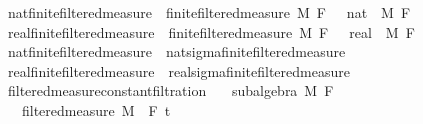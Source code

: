\begin{isabellebody}
\endisatagproof
{\isafoldproof}%
%
\isadelimproof
\isanewline
%
\endisadelimproof
\isanewline
{}\isamarkupfalse%
\ nat{\isacharunderscore}{\kern0pt}finite{\isacharunderscore}{\kern0pt}filtered{\isacharunderscore}{\kern0pt}measure\ {\isacharequal}{\kern0pt}\ finite{\isacharunderscore}{\kern0pt}filtered{\isacharunderscore}{\kern0pt}measure\ M\ F\ {\isachardoublequoteopen}{}\ {\isacharcolon}{\kern0pt}{\isacharcolon}{\kern0pt}\ nat{\isachardoublequoteclose}\ \ M\ F\isanewline
{}\isamarkupfalse%
\ real{\isacharunderscore}{\kern0pt}finite{\isacharunderscore}{\kern0pt}filtered{\isacharunderscore}{\kern0pt}measure\ {\isacharequal}{\kern0pt}\ finite{\isacharunderscore}{\kern0pt}filtered{\isacharunderscore}{\kern0pt}measure\ M\ F\ {\isachardoublequoteopen}{}\ {\isacharcolon}{\kern0pt}{\isacharcolon}{\kern0pt}\ real{\isachardoublequoteclose}\ \ M\ F\isanewline
\isanewline
{}\isamarkupfalse%
\ nat{\isacharunderscore}{\kern0pt}finite{\isacharunderscore}{\kern0pt}filtered{\isacharunderscore}{\kern0pt}measure\ {\isasymsubseteq}\ nat{\isacharunderscore}{\kern0pt}sigma{\isacharunderscore}{\kern0pt}finite{\isacharunderscore}{\kern0pt}filtered{\isacharunderscore}{\kern0pt}measure%
\isadelimproof
\ %
\endisadelimproof
%
\isatagproof
\isacommand{{\isachardot}{\kern0pt}{\isachardot}{\kern0pt}}\isamarkupfalse%
%
\endisatagproof
{\isafoldproof}%
%
\isadelimproof
%
\endisadelimproof
\isanewline
{}\isamarkupfalse%
\ real{\isacharunderscore}{\kern0pt}finite{\isacharunderscore}{\kern0pt}filtered{\isacharunderscore}{\kern0pt}measure\ {\isasymsubseteq}\ real{\isacharunderscore}{\kern0pt}sigma{\isacharunderscore}{\kern0pt}finite{\isacharunderscore}{\kern0pt}filtered{\isacharunderscore}{\kern0pt}measure%
\isadelimproof
\ %
\endisadelimproof
%
\isatagproof
\isacommand{{\isachardot}{\kern0pt}{\isachardot}{\kern0pt}}\isamarkupfalse%
%
\endisatagproof
{\isafoldproof}%
%
\isadelimproof
%
\endisadelimproof
%
\isadelimdocument
%
\endisadelimdocument
%
\isatagdocument
%
\isamarkuptrue%
%
\endisatagdocument
{\isafolddocument}%
%
\isadelimdocument
%
\endisadelimdocument
{}\isamarkupfalse%
\ filtered{\isacharunderscore}{\kern0pt}measure{\isacharunderscore}{\kern0pt}constant{\isacharunderscore}{\kern0pt}filtration{\isacharcolon}{\kern0pt}\isanewline
\ \ \ {\isachardoublequoteopen}subalgebra\ M\ F{\isachardoublequoteclose}\isanewline
\ \ \ {\isachardoublequoteopen}filtered{\isacharunderscore}{\kern0pt}measure\ M\ {\isacharparenleft}{\kern0pt}{\isasymlambda}{\isacharunderscore}{\kern0pt}{\isachardot}{\kern0pt}\ F{\isacharparenright}{\kern0pt}\ t\isanewline

\end{isabellebody}
